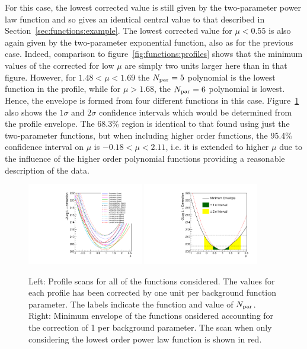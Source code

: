 For this case, the lowest corrected \nll value is still given by the
two-parameter power law function and so gives an identical central value
to that described in Section~\ref{sec:functions:example}. The lowest corrected
\nll value for $\mu < 0.55$ is also again given by the two-parameter exponential
function, also as for the previous case. 
Indeed, comparison to figure~\ref{fig:functions:profiles} shows that the
minimum values of the corrected \nll for low $\mu$
are simply two units larger here than in that figure.
However, for $1.48 < \mu < 1.69$ 
the $N_{\rm par}=5$ polynomial is the lowest function in the profile,
while for $\mu > 1.68$,
the $N_{\rm par}=6$ polynomial is lowest.
Hence, the envelope is formed from four different functions in this
case. Figure~\ref{fig:correction:profiles} also shows the $1\sigma$ and 
$2\sigma$ confidence intervals which would be determined from the 
profile envelope. The 68.3\% region is identical to that found using
just the two-parameter functions, but
when including higher order functions, the 95.4\% confidence interval 
on $\mu$ is $-0.18 < \mu < 2.11$,
i.e. it is extended to higher $\mu$
due to the influence of the higher order polynomial functions providing a 
reasonable description of the data.

\begin{figure}[tbp]
\centering
\includegraphics[width=0.45\textwidth]{correction/ProfilesAllOrders.pdf}
\includegraphics[width=0.45\textwidth]{correction/EnvelopeAllOrders.pdf}
\caption{Left: Profile \nll scans for all of the functions considered. The \nll values for
each profile has been corrected by one unit per background function parameter.
The labels indicate the function and value of $N_{\rm par}$.
Right: Minimum envelope of the functions onsidered accounting for the correction of 1 per 
background parameter. The \nll scan when only considering the lowest order power law function 
is shown in red.}
\label{fig:correction:profiles}
\end{figure}


